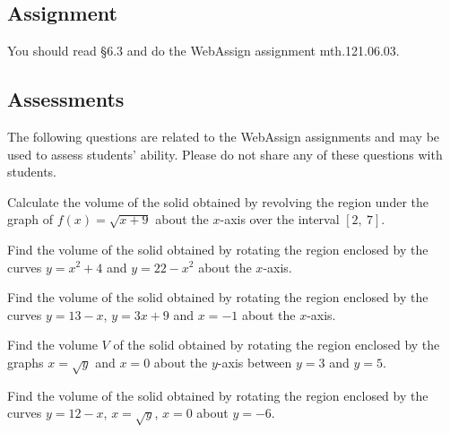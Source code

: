 \documentclass[12pt,addpoints, answers, fleqn]{exam}
\begin{document}
\subsection{Assignment}
You should read \S  6.3 and do the WebAssign assignment mth.121.06.03.
\vfill
\pagebreak
\begin{teacher}
\subsection{Assessments}
The following questions are related to the WebAssign assignments and may be used to assess students' ability. Please do not share any of these questions with students.
\begin{questions}		
\question 	%

Calculate the volume of the solid obtained by revolving the region under the graph of $f\left(x\right) = \sqrt{x + 9}$ about the $x$-axis over the interval $\left[2, \ 7\right]$.
\begin{solution}
\end{solution}


\question 	%

Find the volume of the solid obtained by rotating the region enclosed by the curves $y = x^2 + 4$ and $y = 22 - x^2$ about the $x$-axis.
 \begin{solution}
\end{solution}
 
\question 	%

Find the volume of the solid obtained by rotating the region enclosed by the curves $y = 13 - x$, $y = 3x + 9$ and $x = -1$ about the $x$-axis.
 \begin{solution}
\end{solution}
\question 	%

Find the volume $V$ of the solid obtained by rotating the region enclosed by the graphs $x = \sqrt{y}$ and $x = 0$ about the $y$-axis between $y = 3$ and $y = 5$.

\begin{solution}
\end{solution}
\question 	%

Find the volume of the solid obtained by rotating the region enclosed by the curves  $y = 12 - x$, $x = \sqrt{y}$, $x = 0$ about $y = -6$.
\begin{solution}
\end{solution}
\end{questions}
\end{teacher}
\end{document}
